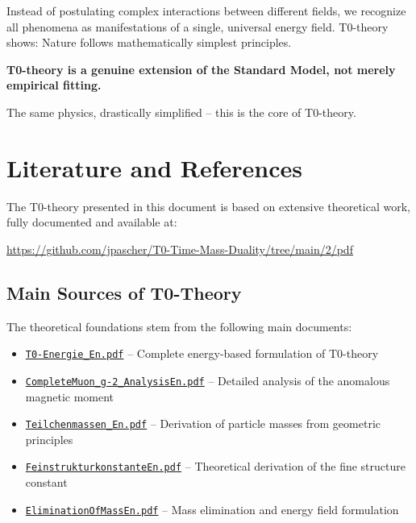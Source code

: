 \documentclass[12pt,a4paper]{article}
\numberwithin{equation}{section}
\begin{document}
	Instead of postulating complex interactions between different fields, we recognize all phenomena as manifestations of a single, universal energy field. T0-theory shows: Nature follows mathematically simplest principles.
	
	\textbf{T0-theory is a genuine extension of the Standard Model, not merely empirical fitting.}
	
	The same physics, drastically simplified -- this is the core of T0-theory.
	
	\section{Literature and References}
	
	The T0-theory presented in this document is based on extensive theoretical work, fully documented and available at:
	
	\begin{center}
		\url{https://github.com/jpascher/T0-Time-Mass-Duality/tree/main/2/pdf}
	\end{center}
	
	\subsection{Main Sources of T0-Theory}
	
	The theoretical foundations stem from the following main documents:
	
	\begin{itemize}
		\item \href{https://github.com/jpascher/T0-Time-Mass-Duality/blob/main/2/pdf/T0-Energie_En.pdf}{\texttt{T0-Energie\_En.pdf}} -- Complete energy-based formulation of T0-theory
		\item \href{https://github.com/jpascher/T0-Time-Mass-Duality/blob/main/2/pdf/CompleteMuon_g-2_AnalysisEn.pdf}{\texttt{CompleteMuon\_g-2\_AnalysisEn.pdf}} -- Detailed analysis of the anomalous magnetic moment
		\item \href{https://github.com/jpascher/T0-Time-Mass-Duality/blob/main/2/pdf/Teilchenmassen_En.pdf}{\texttt{Teilchenmassen\_En.pdf}} -- Derivation of particle masses from geometric principles
		\item \href{https://github.com/jpascher/T0-Time-Mass-Duality/blob/main/2/pdf/FeinstrukturkonstanteEn.pdf}{\texttt{FeinstrukturkonstanteEn.pdf}} -- Theoretical derivation of the fine structure constant
		\item \href{https://github.com/jpascher/T0-Time-Mass-Duality/blob/main/2/pdf/EliminationOfMassEn.pdf}{\texttt{EliminationOfMassEn.pdf}} -- Mass elimination and energy field formulation
	\end{itemize}
	
\end{document}
